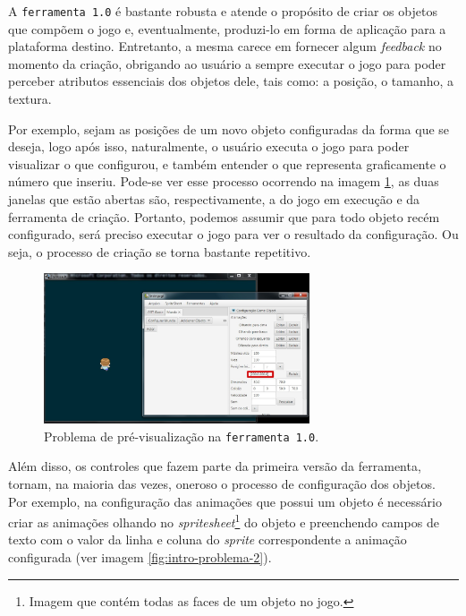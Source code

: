 \documentclass[12pt,twoside,openright,a4paper,english,brazil,sumario=tradicional]{abntex2}
\begin{document}
A \texttt{ferramenta 1.0} é bastante robusta e atende o propósito de criar os objetos que compõem o jogo e, eventualmente, produzi-lo em forma de aplicação para a plataforma destino. Entretanto, a mesma carece em fornecer algum \emph{feedback} no momento da criação, obrigando ao usuário a sempre executar o jogo para poder perceber atributos essenciais dos objetos dele, tais como: a posição, o tamanho, a textura.

Por exemplo, sejam as posições de um novo objeto configuradas da forma que se deseja, logo após isso, naturalmente, o usuário executa o jogo para poder visualizar o que configurou, e também entender o que representa graficamente o número que inseriu. Pode-se ver esse processo ocorrendo na imagem \ref{fig:intro-problema-1}, as duas janelas que estão abertas são, respectivamente, a do jogo em execução e da ferramenta de criação. Portanto, podemos assumir que para todo objeto recém configurado, será preciso executar o jogo para ver o resultado da configuração. Ou seja, o processo de criação se torna bastante repetitivo.

\begin{figure}[h]
   \centering
   \includegraphics[width=0.7\textwidth]{images/problema-1.jpg}
   \caption{Problema de pré-visualização na \texttt{ferramenta 1.0}.}
   \label{fig:intro-problema-1}
\end{figure}

Além disso, os controles que fazem parte da primeira versão da ferramenta, tornam, na maioria das vezes, oneroso o processo de configuração dos objetos. Por exemplo, na configuração das animações que possui um objeto é necessário criar as animações olhando no \emph{spritesheet}\footnote{Imagem que contém todas as faces de um objeto no jogo.} do objeto e preenchendo campos de texto com o valor da linha e coluna do \emph{sprite} correspondente a animação configurada (ver imagem \ref{fig:intro-problema-2}).
\end{document}
